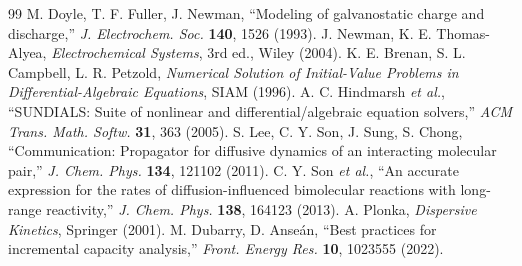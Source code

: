 \documentclass[11pt,a4paper]{article}
\begin{document}
\begin{thebibliography}{99}
 M. Doyle, T. F. Fuller, J. Newman, ``Modeling of galvanostatic charge and discharge,'' \emph{J. Electrochem. Soc.} \textbf{140}, 1526 (1993).
 J. Newman, K. E. Thomas-Alyea, \emph{Electrochemical Systems}, 3rd ed., Wiley (2004).
 K. E. Brenan, S. L. Campbell, L. R. Petzold, \emph{Numerical Solution of Initial-Value Problems in Differential-Algebraic Equations}, SIAM (1996).
 A. C. Hindmarsh \emph{et al.}, ``SUNDIALS: Suite of nonlinear and differential/algebraic equation solvers,'' \emph{ACM Trans. Math. Softw.} \textbf{31}, 363 (2005).
 S. Lee, C. Y. Son, J. Sung, S. Chong, ``Communication: Propagator for diffusive dynamics of an interacting molecular pair,'' \emph{J. Chem. Phys.} \textbf{134}, 121102 (2011).
 C. Y. Son \emph{et al.}, ``An accurate expression for the rates of diffusion-influenced bimolecular reactions with long-range reactivity,'' \emph{J. Chem. Phys.} \textbf{138}, 164123 (2013).
 A. Plonka, \emph{Dispersive Kinetics}, Springer (2001).
 M. Dubarry, D. Anse\'an, ``Best practices for incremental capacity analysis,'' \emph{Front. Energy Res.} \textbf{10}, 1023555 (2022).
\end{thebibliography}
\end{document}
